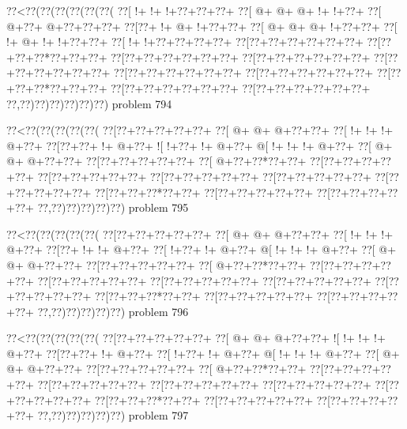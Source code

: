 \vbox{\vbox{\goo
\0??<\0??(\0??(\0??(\0??(\0??(\0??(
\0??[\- !+\- !+\- !+\0??+\0??+\0??+
\0??[\- @+\- @+\- @+\- !+\- !+\0??+
\0??[\- @+\0??+\- @+\0??+\0??+\0??+
\0??[\0??+\- !+\- @+\- !+\0??+\0??+
\0??[\- @+\- @+\- @+\- !+\0??+\0??+
\0??[\- !+\- @+\- !+\- !+\0??+\0??+
\0??[\- !+\- !+\0??+\0??+\0??+\0??+
\0??[\0??+\0??+\0??+\0??+\0??+\0??+
\0??[\0??+\0??+\0??*\0??+\0??+\0??+
\0??[\0??+\0??+\0??+\0??+\0??+\0??+
\0??[\0??+\0??+\0??+\0??+\0??+\0??+
\0??[\0??+\0??+\0??+\0??+\0??+\0??+
\0??[\0??+\0??+\0??+\0??+\0??+\0??+
\0??[\0??+\0??+\0??+\0??+\0??+\0??+
\0??[\0??+\0??+\0??*\0??+\0??+\0??+
\0??[\0??+\0??+\0??+\0??+\0??+\0??+
\0??[\0??+\0??+\0??+\0??+\0??+\0??+
\0??,\0??)\0??)\0??)\0??)\0??)\0??)
}
\hfil problem 794\hfil\break
}

\vbox{\vbox{\goo
\0??<\0??(\0??(\0??(\0??(\0??(
\0??[\0??+\0??+\0??+\0??+\0??+
\0??[\- @+\- @+\- @+\0??+\0??+
\0??[\- !+\- !+\- !+\- @+\0??+
\0??[\0??+\0??+\- !+\- @+\0??+
\- ![\- !+\0??+\- !+\- @+\0??+
\- @[\- !+\- !+\- !+\- @+\0??+
\0??[\- @+\- @+\- @+\0??+\0??+
\0??[\0??+\0??+\0??+\0??+\0??+
\0??[\- @+\0??+\0??*\0??+\0??+
\0??[\0??+\0??+\0??+\0??+\0??+
\0??[\0??+\0??+\0??+\0??+\0??+
\0??[\0??+\0??+\0??+\0??+\0??+
\0??[\0??+\0??+\0??+\0??+\0??+
\0??[\0??+\0??+\0??+\0??+\0??+
\0??[\0??+\0??+\0??*\0??+\0??+
\0??[\0??+\0??+\0??+\0??+\0??+
\0??[\0??+\0??+\0??+\0??+\0??+
\0??,\0??)\0??)\0??)\0??)\0??)
}
\hfil problem 795\hfil\break
}

\vbox{\vbox{\goo
\0??<\0??(\0??(\0??(\0??(\0??(
\0??[\0??+\0??+\0??+\0??+\0??+
\0??[\- @+\- @+\- @+\0??+\0??+
\0??[\- !+\- !+\- !+\- @+\0??+
\0??[\0??+\- !+\- !+\- @+\0??+
\0??[\- !+\0??+\- !+\- @+\0??+
\- @[\- !+\- !+\- !+\- @+\0??+
\0??[\- @+\- @+\- @+\0??+\0??+
\0??[\0??+\0??+\0??+\0??+\0??+
\0??[\- @+\0??+\0??*\0??+\0??+
\0??[\0??+\0??+\0??+\0??+\0??+
\0??[\0??+\0??+\0??+\0??+\0??+
\0??[\0??+\0??+\0??+\0??+\0??+
\0??[\0??+\0??+\0??+\0??+\0??+
\0??[\0??+\0??+\0??+\0??+\0??+
\0??[\0??+\0??+\0??*\0??+\0??+
\0??[\0??+\0??+\0??+\0??+\0??+
\0??[\0??+\0??+\0??+\0??+\0??+
\0??,\0??)\0??)\0??)\0??)\0??)
}
\hfil problem 796\hfil\break
}

\vbox{\vbox{\goo
\0??<\0??(\0??(\0??(\0??(\0??(
\0??[\0??+\0??+\0??+\0??+\0??+
\0??[\- @+\- @+\- @+\0??+\0??+
\- ![\- !+\- !+\- !+\- @+\0??+
\0??[\0??+\0??+\- !+\- @+\0??+
\0??[\- !+\0??+\- !+\- @+\0??+
\- @[\- !+\- !+\- !+\- @+\0??+
\0??[\- @+\- @+\- @+\0??+\0??+
\0??[\0??+\0??+\0??+\0??+\0??+
\0??[\- @+\0??+\0??*\0??+\0??+
\0??[\0??+\0??+\0??+\0??+\0??+
\0??[\0??+\0??+\0??+\0??+\0??+
\0??[\0??+\0??+\0??+\0??+\0??+
\0??[\0??+\0??+\0??+\0??+\0??+
\0??[\0??+\0??+\0??+\0??+\0??+
\0??[\0??+\0??+\0??*\0??+\0??+
\0??[\0??+\0??+\0??+\0??+\0??+
\0??[\0??+\0??+\0??+\0??+\0??+
\0??,\0??)\0??)\0??)\0??)\0??)
}
\hfil problem 797\hfil\break
}

